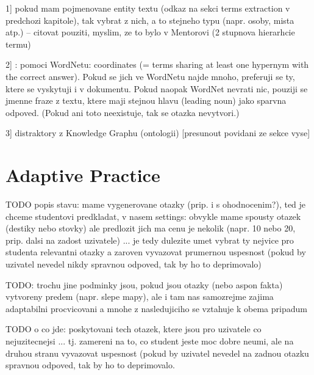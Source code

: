 \documentclass[a4paper, 12pt, twoside]{fithesis2}		%
\renewcommand{\_}{\leavevmode \kern0.0em\vbox{\hrule width0.4em}}
\begin{document}
1] pokud mam pojmenovane entity textu (odkaz na sekci terms extraction v predchozi kapitole), tak vybrat z nich, a to stejneho typu (napr. osoby, mista atp.) -- citovat pouziti, myslim, ze to bylo v Mentorovi (2 stupnova hierarhcie termu)

2] \cite{question-gen-mitkov}:
pomoci WordNetu: coordinates (= terms sharing at least one hypernym with the correct answer). Pokud se jich ve WordNetu najde mnoho, preferuji se ty, ktere se vyskytuji i v dokumentu. Pokud naopak WordNet nevrati nic, pouziji se jmenne fraze z textu, ktere maji stejnou hlavu (leading noun) jako sparvna odpoved. (Pokud ani toto neexistuje, tak se otazka nevytvori.)


3] distraktory z Knowledge Graphu (ontologii) [presunout povidani ze sekce vyse]






\chapter{Adaptive Practice}
\label{chap:practice}

TODO popis stavu: mame vygenerovane otazky (prip. i s ohodnocenim?), ted je chceme studentovi predkladat, v nasem settings: obvykle mame spousty otazek (destiky nebo stovky) ale predlozit jich ma cenu je nekolik (napr. 10 nebo 20, prip. dalsi na zadost uzivatele) ... je tedy dulezite umet vybrat ty nejvice pro studenta relevantni otazky a zaroven vyvazovat prumernou uspesnost (pokud by uzivatel nevedel nikdy spravnou odpoved, tak by ho to deprimovalo)

TODO: trochu jine podminky jsou, pokud jsou otazky (nebo aspon fakta) vytvoreny predem (napr. slepe mapy), ale i tam nas samozrejme zajima adaptabilni procvicovani a mnohe z nasledujiciho se vztahuje k obema pripadum

TODO o co jde: poskytovani tech otazek, ktere jsou pro uzivatele co nejuzitecnejsi ... tj. zamereni na to, co student jeste moc dobre neumi, ale na druhou stranu vyvazovat uspesnost (pokud by uzivatel nevedel na zadnou otazku spravnou odpoved, tak by ho to deprimovalo.
\end{document}
